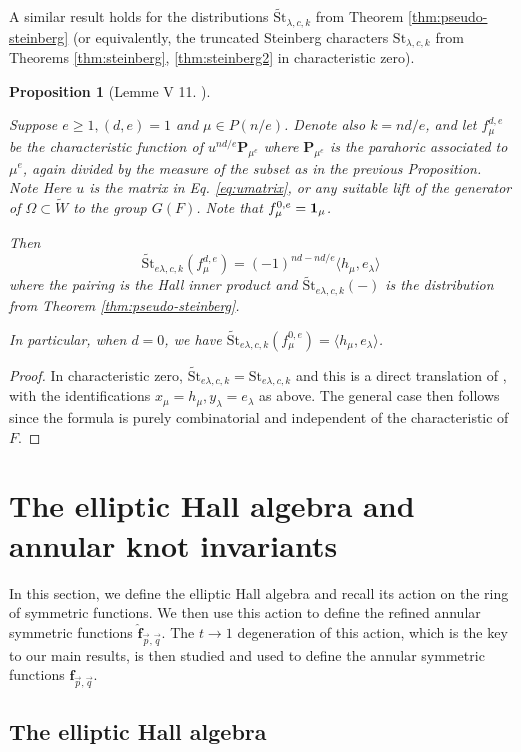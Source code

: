 \documentclass{amsart}
\numberwithin{equation}{section}
\newtheorem{proposition}[lemma]{Proposition}%
\theoremstyle{definition}
\def\16{{\bf 16}}
\def\1{{\bf 1}}
\def\tilde{\widetilde}
\def\hat{\widehat}
\newcommand{\frs}{\mathbf{f}_{\vec{p},\vec{q}}}
\newcommand{\fpq}{\frs}
\newcommand{\tW}{\widetilde{W}}
\newcommand{\bP}{\mathbf{P}}
\newcommand{\fqrs}{\hat{\mathbf{f}}_{\vec{p},\vec{q}}}
\newcommand{\St}{\mathrm{St}}
\begin{document}
A similar result holds for the distributions $\tilde{\St}_{\lambda,c,k}$ from Theorem \ref{thm:pseudo-steinberg} (or equivalently, the truncated Steinberg characters $\St_{\lambda,c,k}$ from Theorems \ref{thm:steinberg}, \ref{thm:steinberg2} in characteristic zero).
\begin{proposition}[Lemme V 11. \cite{W2}]
\label{prop:wpair2}

Suppose $e\geq 1, (d,e)=1$ and $\mu\in P(n/e)$. Denote also $k=nd/e$, and
let $f^{d,e}_\mu$ be the characteristic function
of $u^{nd/e}\bP_{\mu^e}$ where $\bP_{\mu^e}$ is the parahoric associated to $\mu^e$, again divided by the measure of the subset as in the previous Proposition. Note
Here $u$ is the matrix in Eq. \eqref{eq:umatrix}, or any suitable lift of the generator of $\Omega\subset \tW$ to the group $G(F)$. Note that $f^{0,e}_{\mu}=\1_{\mu}$.

Then 
$$\tilde{\St}_{e\lambda, c, k}(f^{d,e}_{\mu})=(-1)^{nd-nd/e}\langle h_\mu, e_\lambda\rangle$$ where the pairing is the Hall inner product and $\tilde{\St}_{e\lambda,c,k}(-)$ is the distribution from Theorem \ref{thm:pseudo-steinberg}.

In particular, when $d=0$, we have $\tilde{\St}_{e\lambda,c,k}(f^{0,e}_{\mu})=\langle h_\mu, e_\lambda\rangle$.
\end{proposition}
\begin{proof}
    In characteristic zero, $\tilde{\St}_{e\lambda,c,k}=\St_{e\lambda,c,k}$ and this is a direct translation of \cite[V. II]{W2}, with the identifications $x_\mu=h_\mu, y_\lambda=e_\lambda$ as above. The general case then follows since the formula is purely combinatorial and independent of the characteristic of $F$.
\end{proof}


\section{The elliptic Hall algebra and annular knot invariants}
\label{sec:eha}
In this section, we define the elliptic Hall algebra and recall its action on the ring of symmetric functions. We then use this action to define the refined annular symmetric functions $\fqrs$. The $t\to 1$ degeneration of this action, which is the key to our main results, is then studied and used to define the annular symmetric functions $\fpq$.

\subsection{The elliptic Hall algebra}\label{subsec:eha}
\end{document}
